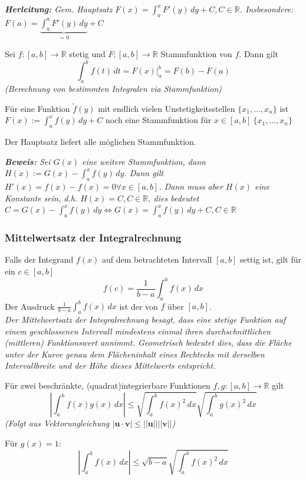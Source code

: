 \textit{\textbf{Herleitung:} Gem. Hauptsatz $F(x)=\int_{a}^{x}F'(y)\, dy + C, C \in \mathbb{R}$.
Insbesondere: $F(a)=\underbrace{\int_{a}^{a}F'(y)\,dy}_{=0}+C$}

Sei $f:[a,b] \rightarrow \mathbb{R}$ stetig und $F:[a,b] \rightarrow \mathbb{R}$ Stammfunktion von $f$. Dann gilt
$$\int_{a}^{b}f(t)\,dt = F(x)|_a^b = F(b)-F(a)$$
\textit{(Berechnung von bestimmten Integralen via Stammfunktion)}

Für eine Funktion $\tilde{f}(y)$ mit endlich vielen Unstetigkeitsstellen $\{x_1, \dots, x_n\}$ ist $F(x):=\int_{a}^{x}f(y)\,dy+C$ noch eine Stammfunktion für $x \in [a,b] \ \{x_1, \dots, x_n\}$

Der Hauptsatz liefert alle möglichen Stammfunktion.

\textit{\textbf{Beweis:} Sei $G(x)$ eine weitere Stammfunktion, dann $H(x):=G(x)-\int_{a}^{x}f(y) \, dy$. Dann gilt $H'(x)=f(x) - f(x)=0 \forall x \in [a,b]$. Dann muss aber $H(x)$ eine Konstante sein, d.h. $H(x)=C, C \in \mathbb{R}$, dies bedeutet $C = G(x)- \int_{a}^{x}f(y)\,dy \iff G(x)= \int_{a}^{x}f(y)\,dy + C, C \in \mathbb{R}$}

\subsubsection{Mittelwertsatz der Integralrechnung}
Falls der Integrand $f(x)$ auf dem betrachteten Intervall $[a,b]$ settig ist, gilt für ein $c\in [a,b]$
$$f(c)=\frac{1}{b-a}\int_{a}^{b} f(x)\,dx$$
Der Ausdruck $\frac{1}{b-a}\int_{a}^{b} f(x)\,dx$ ist der  von $f$ über $[a,b]$.\\
\textit{Der Mittelwertsatz der Integralrechnung besagt, dass eine stetige Funktion auf einem geschlossenen Intervall mindestens einmal ihren durchschnittlichen (mittleren) Funktionswert annimmt. 
Geometrisch bedeutet dies, dass die Fläche unter der Kurve genau dem Flächeninhalt eines Rechtecks mit derselben Intervallbreite und der Höhe dieses Mittelwerts entspricht.}

Für zwei beschränkte, (quadrat)integrierbare Funktionen $f,g:[a,b]\rightarrow \mathbb{R}$ gilt
$$|\int_{a}^{b}f(x)g(x)\,dx|\leq \sqrt{\int_{a}^{b}f(x)^2\,dx}\sqrt{\int_{a}^{b}g(x)^2\,dx}$$
\textit{(Folgt aus Vektorungleichung $|\mathbf{u}\cdot\mathbf{v}|\leq||\mathbf{u}||||\mathbf{v}||$)}

\begin{exercise}
    Für $g(x)=1$:
    $$|\int_{a}^{b}f(x)\,dx|\leq \sqrt{b-a}\sqrt{\int_{a}^{b}f(x)^2\,dx}$$
\end{exercise}